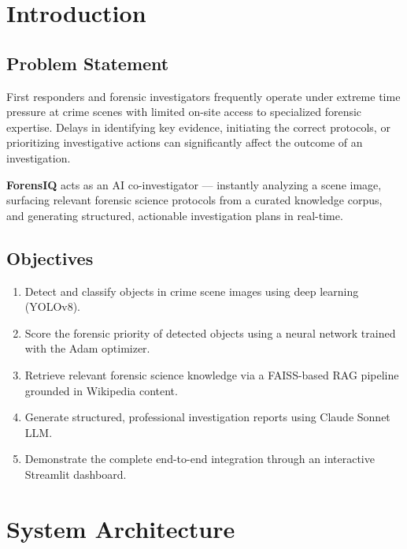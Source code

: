\documentclass[12pt,a4paper]{article}
\begin{document}
\tableofcontents
\newpage

\section{Introduction}

\subsection{Problem Statement}

First responders and forensic investigators frequently operate under extreme time
pressure at crime scenes with limited on-site access to specialized forensic expertise.
Delays in identifying key evidence, initiating the correct protocols, or prioritizing
investigative actions can significantly affect the outcome of an investigation.

\textbf{ForensIQ} acts as an AI co-investigator — instantly analyzing a scene image,
surfacing relevant forensic science protocols from a curated knowledge corpus, and
generating structured, actionable investigation plans in real-time.

\subsection{Objectives}

\begin{enumerate}[leftmargin=*, label=\textbf{\arabic*.}]
  \item Detect and classify objects in crime scene images using deep learning (YOLOv8).
  \item Score the forensic priority of detected objects using a neural network trained
        with the Adam optimizer.
  \item Retrieve relevant forensic science knowledge via a FAISS-based RAG pipeline
        grounded in Wikipedia content.
  \item Generate structured, professional investigation reports using Claude Sonnet LLM.
  \item Demonstrate the complete end-to-end integration through an interactive Streamlit
        dashboard.
\end{enumerate}

\section{System Architecture}
\end{document}
